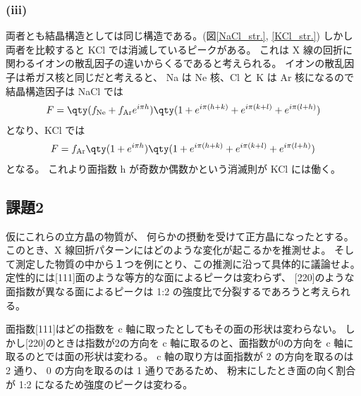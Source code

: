 \documentclass[11pt,dvipdfmx,a4paper]{jsarticle}
\begin{document}
\subsubsection*{(iii)}
両者とも結晶構造としては同じ構造である。(図\ref{NaCl_str.}, \ref{KCl_str.})
しかし両者を比較すると KCl では消滅しているピークがある。
これは X 線の回折に関わるイオンの散乱因子の違いからくるであると考えられる。
イオンの散乱因子は希ガス核と同じだと考えると、
Na は Ne 核、Cl と K は Ar 核になるので結晶構造因子は
NaCl では
\begin{align}
	F = \qty(f_{\text{Ne}}+f_{\text{Ar}}e^{i\pi h})\qty(1+e^{i\pi(h+k)}+e^{i\pi(k+l)}+e^{i\pi(l+h)})
\end{align}
となり、KCl では
\begin{align}
	F = f_{\text{Ar}}\qty(1 + e^{i\pi h})\qty(1+e^{i\pi(h+k)}+e^{i\pi(k+l)}+e^{i\pi(l+h)})
\end{align}
となる。
これより面指数 h が奇数か偶数かという消滅則が KCl には働く。

\subsection*{課題2} 仮にこれらの立方晶の物質が、
何らかの摂動を受けて正方晶になったとする。
このとき、X 線回折パターンにはどのような変化が起こるかを推測せよ。
そして測定した物質の中から１つを例にとり、この推測に沿って具体的に議論せよ。\\

定性的には[111]面のような等方的な面によるピークは変わらず、
[220]のような面指数が異なる面によるピークは 1:2 の強度比で分裂するであろうと考えられる。

面指数[111]はどの指数を c 軸に取ったとしてもその面の形状は変わらない。%
しかし[220]のときは指数が2の方向を c 軸に取るのと、面指数が0の方向を c 軸に取るのとでは面の形状は変わる。
c 軸の取り方は面指数が 2 の方向を取るのは 2 通り、 0 の方向を取るのは 1 通りであるため、
粉末にしたとき面の向く割合が 1:2 になるため強度のピークは変わる。
\end{document}
